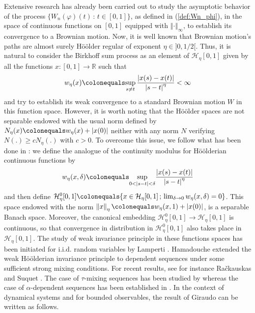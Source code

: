 \documentclass{ws-sd}
\newcommand{\R}{\mathbb{R}}
\newcommand{\norm}[1]{\left\Vert #1\right\Vert}
\newcommand{\abs}[1]{\left\lvert #1 \right\rvert}
\newcommand{\eqdef}{\colonequals}
\begin{document}
Extensive research has already been carried out to study the asymptotic behavior of the process $\{W_n(\varphi)(t) \, : \, t \in [0,1]\}$, as defined in (\ref{def:Wn_phi}), in the space of continuous functions on $[0,1]$ equipped with $\norm{\cdot}_\infty$, to establish its convergence to a Brownian motion.
Now, it is well known that Brownian motion's paths are almost surely Hö\"older regular of exponent $\eta \in ]0,1/2[$. Thus, it is natural to consider the Birkhoff sum process as an element of $\mathcal H _\eta [0,1]$ given by all the functions $x : [0,1] \to \R$ such that
\begin{align*}
    w_\eta (x) \eqdef \underset{s \neq t}{\sup} \, \frac{\abs{x(s) - x(t)}}{\abs{s-t}^\eta} < \infty
\end{align*}
and try to establish its weak convergence to a standard Brownian motion $W$ in this function space.
However, it is worth noting that the H\"oölder spaces are not separable endowed with the usual norm defined by $N_\eta(x) \eqdef w_\eta(x) + \abs{x(0)}$ neither with any norm $N$  verifying $N(.) \ge cN_\eta(.)$ with $c>0$. To overcome this issue, we follow what has been done in \cite{3}: we define the analogue of the continuity modulus for Hö\"olderian continuous functions by
\begin{align*}
    w_\eta (x, \delta)
    \eqdef
    \underset{0 < \abs{s-t} < \delta}{\sup} \frac{\abs{x(s) - x(t)}}{\abs{s-t}^\eta}
\end{align*}
and then define $\mathcal H _\eta^0 [0,1] \eqdef \{x \in \mathcal H _\eta [0,1] \, ; \, \lim_{\delta \to 0} w_\eta (x, \delta) = 0\}$. This space endowed with the norm $\norm{x}_\eta \eqdef w_\eta (x, 1) + \abs{x(0)}$, is a separable Banach space. Moreover, the canonical embedding $\mathcal H _\eta^0 [0,1] \to \mathcal H _\eta [0,1]$ is continuous, so that convergence in distribution in $\mathcal H _\eta^0 [0,1]$ also takes place in $\mathcal H _\eta [0,1]$.
The study of weak invariance principle in these functions spaces has been initiated for i.i.d. random variables by Lamperti \cite{20}. Hamadouche \cite{16} extended the weak Hö\"olderian invariance principle to dependent sequences under some sufficient strong mixing conditions. For recent results, see for instance Ra\v{c}kauskas and Suquet \cite{24}.
The case of $\tau$-mixing sequences has been studied by \cite{12} whereas the case of $\alpha$-dependent sequences has been established in \cite{9}. In the context of dynamical systems and for bounded observables, the result of Giraudo can be written as follows.
\end{document}
